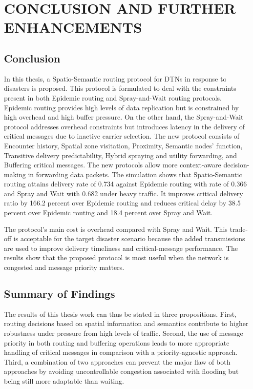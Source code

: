 \chapter{\MakeUppercase{Conclusion and Further Enhancements}}
\section{Conclusion}
In this thesis, a Spatio-Semantic routing protocol for DTNs in response to disasters is proposed. This protocol is formulated to deal with the constraints present in both Epidemic routing and Spray-and-Wait routing protocols. Epidemic routing provides high levels of data replication but is constrained by high overhead and high buffer pressure. On the other hand, the Spray-and-Wait protocol addresses overhead constraints but introduces latency in the delivery of critical messages due to inactive carrier selection.
The new protocol consists of Encounter history, Spatial zone visitation, Proximity, Semantic nodes' function, Transitive delivery predictability, Hybrid spraying and utility forwarding, and Buffering critical messages. The new protocols allow more context-aware decision-making in forwarding data packets. The simulation shows that Spatio-Semantic routing attains delivery rate of 0.734 against Epidemic routing with rate of 0.366 and Spray and Wait with 0.682 under heavy traffic. It improves critical delivery ratio by 166.2 percent over Epidemic routing and reduces critical delay by 38.5 percent over Epidemic routing and 18.4 percent over Spray and Wait.

The protocol's main cost is overhead compared with Spray and Wait. This trade-off is acceptable for the target disaster scenario because the added transmissions are used to improve delivery timeliness and critical-message performance. The results show that the proposed protocol is most useful when the network is congested and message priority matters.

\section{Summary of Findings}
The results of this thesis work can thus be stated in three propositions. First, routing decisions based on spatial information and semantics contribute to higher robustness under pressure from high levels of traffic. Second, the use of message priority in both routing and buffering operations leads to more appropriate handling of critical messages in comparison with a priority-agnostic approach. Third, a combination of two approaches can prevent the major flaw of both approaches by avoiding uncontrollable congestion associated with flooding but being still more adaptable than waiting.

